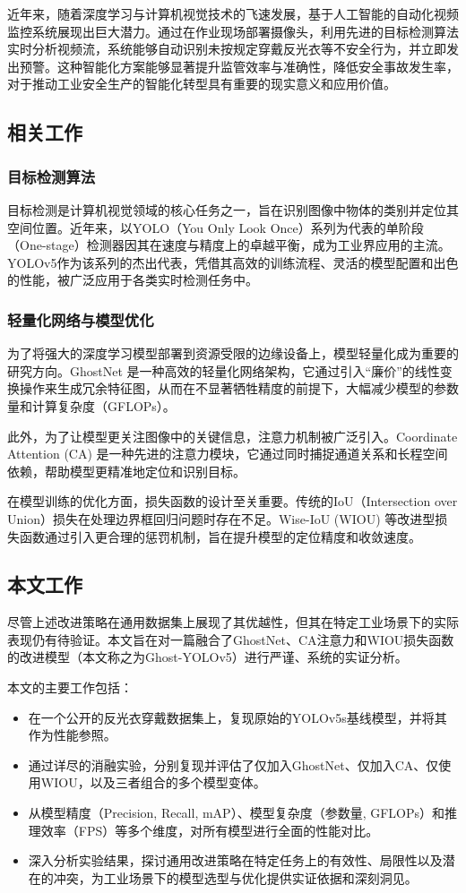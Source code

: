 \documentclass[a4paper]{ctexart}
\begin{document}
近年来，随着深度学习与计算机视觉技术的飞速发展，基于人工智能的自动化视频监控系统展现出巨大潜力。通过在作业现场部署摄像头，利用先进的目标检测算法实时分析视频流，系统能够自动识别未按规定穿戴反光衣等不安全行为，并立即发出预警。这种智能化方案能够显著提升监管效率与准确性，降低安全事故发生率，对于推动工业安全生产的智能化转型具有重要的现实意义和应用价值。

\subsection{相关工作}
\subsubsection{目标检测算法}
目标检测是计算机视觉领域的核心任务之一，旨在识别图像中物体的类别并定位其空间位置。近年来，以YOLO（You Only Look Once）系列为代表的单阶段（One-stage）检测器因其在速度与精度上的卓越平衡，成为工业界应用的主流。YOLOv5作为该系列的杰出代表，凭借其高效的训练流程、灵活的模型配置和出色的性能，被广泛应用于各类实时检测任务中。

\subsubsection{轻量化网络与模型优化}
为了将强大的深度学习模型部署到资源受限的边缘设备上，模型轻量化成为重要的研究方向。GhostNet \cite{ghostnet} 是一种高效的轻量化网络架构，它通过引入“廉价”的线性变换操作来生成冗余特征图，从而在不显著牺牲精度的前提下，大幅减少模型的参数量和计算复杂度（GFLOPs）。

此外，为了让模型更关注图像中的关键信息，注意力机制被广泛引入。Coordinate Attention (CA) \cite{ca} 是一种先进的注意力模块，它通过同时捕捉通道关系和长程空间依赖，帮助模型更精准地定位和识别目标。

在模型训练的优化方面，损失函数的设计至关重要。传统的IoU（Intersection over Union）损失在处理边界框回归问题时存在不足。Wise-IoU (WIOU) \cite{wiou} 等改进型损失函数通过引入更合理的惩罚机制，旨在提升模型的定位精度和收敛速度。

\subsection{本文工作}
尽管上述改进策略在通用数据集上展现了其优越性，但其在特定工业场景下的实际表现仍有待验证。本文旨在对一篇融合了GhostNet、CA注意力和WIOU损失函数的改进模型（本文称之为Ghost-YOLOv5）进行严谨、系统的实证分析。

本文的主要工作包括：
\begin{itemize}
    \item 在一个公开的反光衣穿戴数据集上，复现原始的YOLOv5s基线模型，并将其作为性能参照。
    \item 通过详尽的消融实验，分别复现并评估了仅加入GhostNet、仅加入CA、仅使用WIOU，以及三者组合的多个模型变体。
    \item 从模型精度（Precision, Recall, mAP）、模型复杂度（参数量, GFLOPs）和推理效率（FPS）等多个维度，对所有模型进行全面的性能对比。
    \item 深入分析实验结果，探讨通用改进策略在特定任务上的有效性、局限性以及潜在的冲突，为工业场景下的模型选型与优化提供实证依据和深刻洞见。
\end{itemize}
\end{document}
